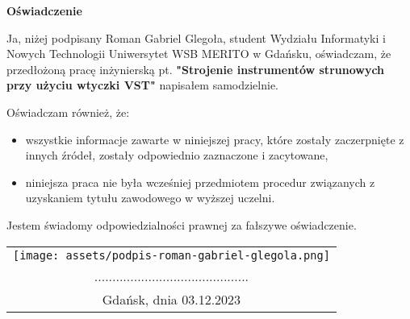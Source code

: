 \thispagestyle{empty}
\begin{center}
    \Large{\textbf{Oświadczenie}}
\end{center}

\vspace{2cm}

Ja, niżej podpisany Roman Gabriel Glegoła, student Wydziału Informatyki i Nowych Technologii Uniwersytet WSB MERITO w Gdańsku, oświadczam, że przedłożoną pracę inżynierską pt. \textbf{"Strojenie instrumentów strunowych przy użyciu wtyczki VST"} napisałem samodzielnie.

Oświadczam również, że:
\begin{itemize}
    \item wszystkie informacje zawarte w niniejszej pracy, które zostały zaczerpnięte z innych źródeł, zostały odpowiednio zaznaczone i zacytowane,
    \item niniejsza praca nie była wcześniej przedmiotem procedur związanych z uzyskaniem tytułu zawodowego w wyższej uczelni.
\end{itemize}

Jestem świadomy odpowiedzialności prawnej za fałszywe oświadczenie.

\vspace{2cm}

\begin{flushright}
    \begin{tabular}{c}
    \texttt{[image: assets/podpis-roman-gabriel-glegola.png]}\\
    ...........................................\\
    Gdańsk, dnia 03.12.2023 \\
    \end{tabular}
\end{flushright}

\vfill